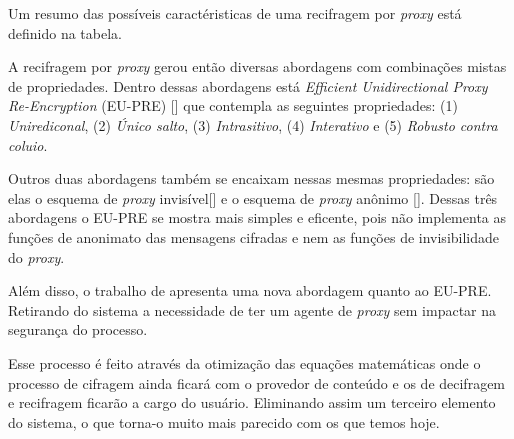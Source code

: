 Um resumo das possíveis caractéristicas de uma recifragem por \emph{proxy} está definido na tabela.

%

A recifragem por \emph{proxy} gerou então diversas abordagens com combinações mistas de propriedades. Dentro dessas abordagens está \emph{Efficient Unidirectional Proxy Re-Encryption} (EU-PRE) [\cite{chow2010efficient}] que contempla as seguintes propriedades: (1) \textit{Unirediconal}, (2) \textit{Único salto}, (3) \textit{Intrasitivo}, (4) \textit{Interativo} e (5) \textit{Robusto contra coluio}.

Outros duas abordagens também se encaixam nessas mesmas propriedades: são elas o esquema de \emph{proxy} invisível[\cite{jia2010cca}] e o esquema de \emph{proxy} anônimo [\cite{shao2012anonymous}]. Dessas três abordagens o EU-PRE se mostra mais simples e eficente, pois não implementa as funções de anonimato das mensagens cifradas e nem as funções de invisibilidade do \emph{proxy}.

Além disso, o trabalho de \cite{mannes2016controle} apresenta uma nova abordagem quanto ao EU-PRE. Retirando do sistema a necessidade de ter um agente de \emph{proxy}  sem impactar na segurança do processo.

Esse processo é feito através da otimização das equações matemáticas onde o processo de cifragem ainda ficará com o provedor de conteúdo e os de decifragem e recifragem ficarão a cargo do usuário. Eliminando assim um terceiro elemento do sistema, o que torna-o muito mais parecido com os que temos hoje.